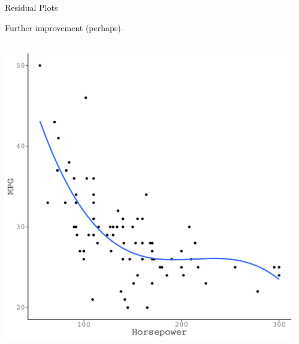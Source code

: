\documentclass{beamer}\usepackage[]{graphicx}\usepackage[]{color}
\makeatletter
\def\maxwidth{ %
  \ifdim\Gin@nat@width>\linewidth
    \linewidth
  \else
    \Gin@nat@width
  \fi
}
\newenvironment{knitrout}{}{} %
\makeatother
\begin{document}
\begin{frame}{Residual Plots}

  Further improvement (perhaps).
  \vb
  \begin{columns}
    \begin{column}{0.5\textwidth}
      
\begin{knitrout}\footnotesize
{}\color{fgcolor}

{\centering \includegraphics[width=\maxwidth]{figure/unnamed-chunk-18-1} 

}



\end{knitrout}

\end{column}

\begin{column}{0.5\textwidth}
  
\begin{knitrout}\footnotesize
{}\color{fgcolor}


\end{knitrout}
\end{column}
\end{columns}
\end{frame}
\end{document}
